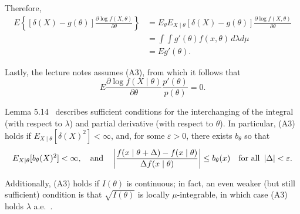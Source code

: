\begin{solution}
  Therefore,
  \[
    \begin{aligned}
      E\left\{ [\delta(X) - g(\theta)] \frac{\partial \log f(X, \theta)}{\partial \theta}\right\}
       & = E_\theta E_{X \mid \theta} [\delta(X) - g(\theta)] \frac{\partial \log f(X, \theta)}{\partial \theta} \\
       & = \int \int g'(\theta) f(x, \theta)\, d \lambda d \mu                                                   \\
       & = E g'(\theta).
    \end{aligned}
  \]

  Lastly, the lecture notes assumes (A3), from which it follows that
  \[
    E \frac{\partial \log f(X \mid \theta)}{\partial \theta} \frac{p'(\theta)}{p(\theta)} = 0.
  \]

  Lemma 5.14~\cite[p.~122]{tpe} describes sufficient conditions for the interchanging of the integral (with respect to \( \lambda \)) and partial derivative (with respect to \( \theta \)). In particular, (A3) holds if \( E_{X \mid \theta} [\delta(X)^2] < \infty \), and, for some \( \varepsilon > 0 \), there exists \( b_\theta \) so that
  \[
    E_{X \mid \theta}[b_\theta(X)^2] < \infty, \quad \text{and} \quad \left\lvert\frac{f(x \mid \theta + \Delta) - f(x \mid \theta)}{\Delta f(x \mid \theta)}\right\rvert \le b_\theta(x) \quad \text{for all }  \left\lvert\Delta\right\rvert < \varepsilon.
  \]

  Additionally, (A3) holds if \( I(\theta) \) is continuous; in fact, an even weaker (but still sufficient) condition is that \( \sqrt{I(\theta)} \) is locally \( \mu \)-integrable, in which case (A3) holds \( \lambda \) a.e.~\cite{vanTree1995}.
\end{solution}
